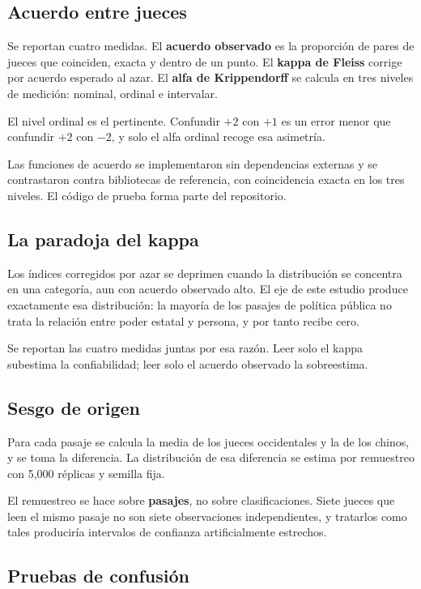 \subsection{Acuerdo entre jueces}

Se reportan cuatro medidas. El \textbf{acuerdo observado} es la proporción de pares de jueces que coinciden, exacta y dentro de un punto. El \textbf{kappa de Fleiss} corrige por acuerdo esperado al azar. El \textbf{alfa de Krippendorff} se calcula en tres niveles de medición: nominal, ordinal e intervalar.

El nivel ordinal es el pertinente. Confundir $+2$ con $+1$ es un error menor que confundir $+2$ con $-2$, y solo el alfa ordinal recoge esa asimetría.

Las funciones de acuerdo se implementaron sin dependencias externas y se contrastaron contra bibliotecas de referencia, con coincidencia exacta en los tres niveles. El código de prueba forma parte del repositorio.

\subsection{La paradoja del kappa}

Los índices corregidos por azar se deprimen cuando la distribución se concentra en una categoría, aun con acuerdo observado alto. El eje de este estudio produce exactamente esa distribución: la mayoría de los pasajes de política pública no trata la relación entre poder estatal y persona, y por tanto recibe cero.

Se reportan las cuatro medidas juntas por esa razón. Leer solo el kappa subestima la confiabilidad; leer solo el acuerdo observado la sobreestima.

\subsection{Sesgo de origen}

Para cada pasaje se calcula la media de los jueces occidentales y la de los chinos, y se toma la diferencia. La distribución de esa diferencia se estima por remuestreo con 5{,}000 réplicas y semilla fija.

El remuestreo se hace sobre \textbf{pasajes}, no sobre clasificaciones. Siete jueces que leen el mismo pasaje no son siete observaciones independientes, y tratarlos como tales produciría intervalos de confianza artificialmente estrechos.

\subsection{Pruebas de confusión}

